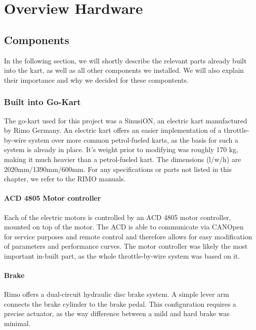 
\chapter{Overview Hardware}
\label{chp:Hardware}

\section{Components}
In the following section, we will shortly describe the relevant parts already built into the kart, as well as all other components we installed. We will also explain their importance and why we decided for these compontents.

\subsection{Built into Go-Kart}

The go-kart used for this project was a SinusiON, an electric kart manufactured by Rimo Germany. An electric kart offers an easier implementation of a throttle-by-wire system over more common petrol-fueled karts, as the basis for such a system is already in place. 
It's weight prior to modifying was roughly 170 kg, making it much heavier than a petrol-fueled kart. The dimensions (l/w/h) are 2020mm/1390mm/600mm.
For any specifications or parts not listed in this chapter, we refer to the RIMO manuals.


\subsubsection{ACD 4805 Motor controller}
Each of the electric motors is controlled by an ACD 4805 motor controller, mounted on top of the motor. The ACD is able to communicate via CANOpen for service purposes and remote control and therefore allows for easy modification of parameters and performance curves. The motor controller was likely the most important in-built part, as the whole throttle-by-wire system was based on it.


\subsubsection{Brake}
Rimo offers a dual-circuit hydraulic disc brake system. A simple lever arm connects the brake cylinder to the brake pedal. This configuration requires a precise actuator, as the way difference between a mild and hard brake was minimal. 

